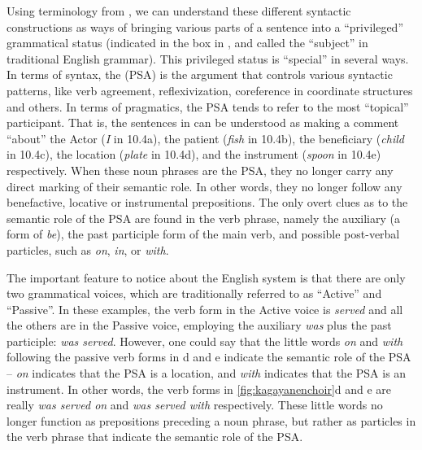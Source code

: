 Using terminology from \citet{vanvalin1997}, we can understand these different syntactic constructions as ways of bringing various parts of a sentence into a “privileged” grammatical status (indicated in the box in , and called the “subject” in traditional English grammar). This privileged status is “special” in several ways. In terms of syntax, the  (PSA) is the argument that controls various syntactic patterns, like verb agreement, reflexivization, coreference in coordinate structures and others. In terms of pragmatics, the PSA tends to refer to the most “topical” participant. That is, the sentences in  can be understood as making a comment “about” the Actor (\textit{I} in 10.4a), the patient (\textit{fish} in 10.4b), the beneficiary (\textit{child} in 10.4c), the location (\textit{plate} in  10.4d), and the instrument (\textit{spoon} in 10.4e) respectively. When these noun phrases are the PSA, they no longer carry any direct marking of their semantic role. In other words, they no longer follow any benefactive, locative or instrumental prepositions. The only overt clues as to the semantic role of the PSA are found in the verb phrase, namely the auxiliary (a form of \textit{be}), the past participle form of the main verb, and possible post-verbal particles, such as \textit{on}, \textit{in}, or \textit{with}.

The important feature to notice about the English system is that there are only two grammatical voices, which are traditionally referred to as “Active” and “Passive”. In these examples, the verb form in the Active voice is \textit{served} and all the others are in the Passive voice, employing the auxiliary \textit{was} plus the past participle: \textit{was served}. However, one could say that the little words \textit{on} and \textit{with} following the passive verb forms in d and e indicate the semantic role of the PSA -- \textit{on} indicates that the PSA is a location, and \textit{with} indicates that the PSA is an instrument. In other words, the verb forms in \ref{fig:kagayanenchoir}d and e are really \textit{was served on} and \textit{was served with} respectively. These little words no longer function as prepositions preceding a noun phrase, but rather as particles in the verb phrase that indicate the semantic role of the PSA.

